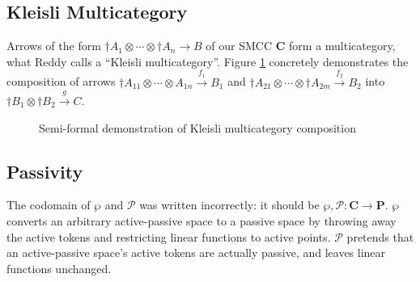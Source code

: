 \documentclass{article}
\newcommand{\mbf}{\mathbf}
\begin{document}
\subsection*{Kleisli Multicategory}

Arrows of the form $\dagger A_1 \otimes \cdots \otimes \dagger A_n \to B$ of our SMCC $\mbf{C}$ form a multicategory, what Reddy calls a ``Kleisli multicategory''. Figure \ref{fig:multicomp} concretely demonstrates the composition of arrows $\dagger A_{11} \otimes \cdots \otimes A_{1n} \overset{f_1}{\to} B_1$ and $\dagger A_{21} \otimes \cdots \otimes \dagger A_{2m} \overset{f_2}{\to} B_2$ into $\dagger B_1 \otimes \dagger B_2 \overset{g}{\to} C$.

\begin{figure}
\caption{Semi-formal demonstration of Kleisli multicategory composition}
\label{fig:multicomp}
\end{figure}

\subsection*{Passivity}

The codomain of $\wp$ and $\mathcal P$ was written incorrectly: it should be $\wp, \mathcal P : \mbf{C} \to \mbf{P}$. $\wp$ converts an arbitrary
active-passive space to a passive space by throwing away the active tokens and restricting linear functions to active points. $\mathcal P$ pretends that an active-passive space's active tokens are actually passive, and leaves linear functions unchanged.
\end{document}
